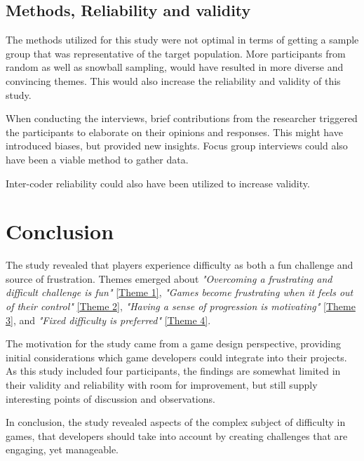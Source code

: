 \subsection{Methods, Reliability and validity}

The methods utilized for this study were not optimal in terms of getting a sample group that was representative of the target population. More participants from random as well as snowball sampling, would have resulted in more diverse and convincing themes. This would also increase the reliability and validity of this study.

When conducting the interviews, brief contributions from the researcher triggered the participants to elaborate on their opinions and responses. This might have introduced biases, but provided new insights. Focus group interviews could also have been a viable method to gather data. 

Inter-coder reliability could also have been utilized to increase validity.

\clearpage

\section{Conclusion}
The study revealed that players experience difficulty as both a fun challenge and source of frustration. Themes emerged about \textit{"Overcoming a frustrating and difficult challenge is fun"} \ref{Theme 1}, \textit{"Games become frustrating when it feels out of their control"} \ref{Theme 2}, \textit{"Having a sense of progression is motivating"} \ref{Theme 3}, and \textit{"Fixed difficulty is preferred"} \ref{Theme 4}.

The motivation for the study came from a game design perspective, providing initial considerations which game developers could integrate into their projects. As this study included four participants, the findings are somewhat limited in their validity and reliability with room for improvement, but still supply interesting points of discussion and observations.

In conclusion, the study revealed aspects of the complex subject of difficulty in games, that developers should take into account by creating challenges that are engaging, yet manageable. 

\clearpage